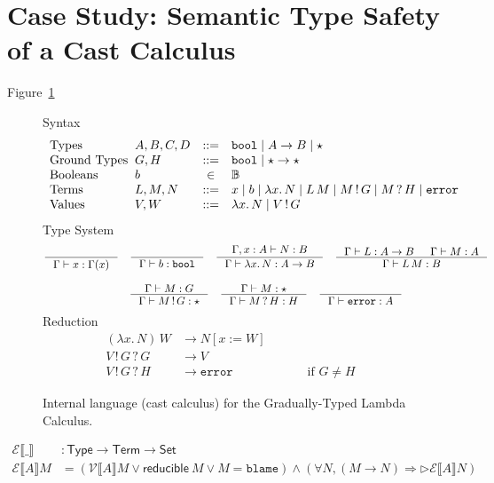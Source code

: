 \documentclass[acmsmall]{acmart}
\makeatletter
\newcommand{\sem}[1]{\llbracket #1 \rrbracket}
\newcommand{\semV}[1]{\mathcal{V}\sem{#1}}
\newcommand{\semE}[1]{\mathcal{E}\sem{#1}}
\newcommand{\ba}{\begin{array}}
\newcommand{\ea}{\end{array}}
\newenvironment{syntax}{\[\ba{l@{\;\;}lcl}}{\ea\]}
\newcommand{\dotspace}{.\,}
\newcommand{\key}[1]{\ensuremath{\mathtt{#1}}}
\newcommand{\dyn}{\star}
\newcommand{\Bool}{\key{bool}}
\newcommand{\lam}[1]{\lambda #1 \dotspace}
\newcommand{\app}{\,}
\newcommand{\reduce}{\longrightarrow}
\newcommand{\inj}[2]{#1 \,!\, #2}
\newcommand{\proj}[2]{#1 \,?\, #2}
\makeatother
\begin{document}
\section{Case Study: Semantic Type Safety of a Cast Calculus}


Figure~\ref{fig:CC}

\begin{figure}
  \raggedright Syntax
  \begin{syntax}
    \text{Types} & A,B,C,D &::=& \Bool \mid A \to B \mid \dyn \\
    \text{Ground Types} & G,H & ::= & \mathtt{bool} \mid \dyn \to \dyn \\
    \text{Booleans} & b & \in & \mathbb{B} \\
    \text{Terms} & L,M,N & ::= & x \mid b \mid \lam{x}N \mid L \app M
      \mid \inj{M}{G} \mid \proj{M}{H} \mid \mathtt{error} \\
      \text{Values} & V,W & ::= & \lam{x}N \mid \inj{V}{G}
  \end{syntax}
  Type System
  \begin{gather*}
    \inference{}{\Gamma \vdash x : \Gamma(x)}
    \quad
    \inference{}{\Gamma \vdash b : \Bool}
    \quad
    \inference{\Gamma, x : A \vdash N : B}
              {\Gamma \vdash \lam{x} N : A \to B}
    \quad              
    \inference{\Gamma \vdash L : A \to B & \Gamma \vdash M : A}
          {\Gamma \vdash L \app M : B} \\[2ex]
   \inference{\Gamma \vdash M : G}
          {\Gamma \vdash \inj{M}{G} : \dyn}
   \quad
   \inference{\Gamma \vdash M : \dyn}
             {\Gamma \vdash \proj{M}{H} : H}
   \quad
   \inference{}
             {\Gamma \vdash \mathtt{error} : A}
  \end{gather*}
Reduction
\begin{align*}
  (\lam{x} N)\app W & \reduce N[x:=W] \\
  \proj{\inj{V}{G}}{G} & \reduce V \\
  \proj{\inj{V}{G}}{H} & \reduce \texttt{error}
       \qquad\qquad\qquad\text{if } G \neq H 
\end{align*}

  \caption{Internal language (cast calculus) for the Gradually-Typed
    Lambda Calculus.}
  \label{fig:CC}
\end{figure}



\begin{align*}
    \semE{\_} &: \mathsf{Type} \to \mathsf{Term} \to \mathsf{Set} \\
    \semE{A} M &= (\semV{A} M \lor \mathsf{reducible}\ M \lor M=\mathtt{blame})
                \land (\forall N, (M \reduce N) \Rightarrow \rhd \semE{A} N)
\end{align*}



\end{document}
